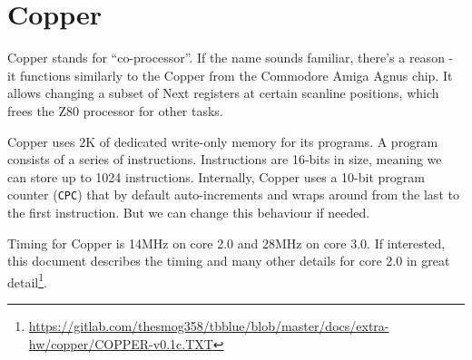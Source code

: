 \section{Copper}
\label{zx_next_copper}


Copper stands for ``co-processor''. If the name sounds familiar, there's a reason - it functions similarly to the Copper from the Commodore Amiga Agnus chip. It allows changing a subset of Next registers at certain scanline positions, which frees the Z80 processor for other tasks.

Copper uses 2K of dedicated write-only memory for its programs. A program consists of a series of instructions. Instructions are 16-bits in size, meaning we can store up to 1024 instructions. Internally, Copper uses a 10-bit program counter ({\tt CPC}) that by default auto-increments and wraps around from the last to the first instruction. But we can change this behaviour if needed.

Timing for Copper is 14MHz on core 2.0 and 28MHz on core 3.0. If interested, this document describes the timing and many other details for core 2.0 in great detail\footnote{\url{https://gitlab.com/thesmog358/tbblue/blob/master/docs/extra-hw/copper/COPPER-v0.1c.TXT}}.


